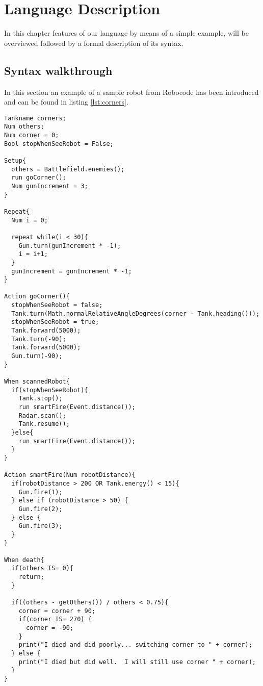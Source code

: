 \chapter{Language Description}
\label{chap:LanguageDescription}
In this chapter features of our language by means of a simple example, will be overviewed followed by a formal description of its syntax. 

\section{Syntax walkthrough}
In this section an example of a sample robot from Robocode has been introduced and can be found in listing \ref{lst:corners}.

\begin{lstlisting}[caption={Eksampel of the sample robot "Corners" in our language}, label={lst:corners}]
Tankname corners;
Num others;
Num corner = 0;
Bool stopWhenSeeRobot = False;

Setup{
  others = Battlefield.enemies();  
  run goCorner();	 
  Num gunIncrement = 3;
}

Repeat{  
  Num i = 0;
  
  repeat while(i < 30){
    Gun.turn(gunIncrement * -1);
    i = i+1;
  }  
  gunIncrement = gunIncrement * -1;
}

Action goCorner(){
  stopWhenSeeRobot = false;  
  Tank.turn(Math.normalRelativeAngleDegrees(corner - Tank.heading()));      
  stopWhenSeeRobot = true;
  Tank.forward(5000);
  Tank.turn(-90);
  Tank.forward(5000);
  Gun.turn(-90);
}

When scannedRobot{
  if(stopWhenSeeRobot){
    Tank.stop();                                     
    run smartFire(Event.distance());
    Radar.scan();                                     
    Tank.resume();                                   
  }else{
    run smartFire(Event.distance());
  }
}

Action smartFire(Num robotDistance){
  if(robotDistance > 200 OR Tank.energy() < 15){
    Gun.fire(1);
  } else if (robotDistance > 50) {
    Gun.fire(2);
  } else {
    Gun.fire(3);
  }
}

When death{
  if(others IS= 0){
    return;
  }
  
  if((others - getOthers()) / others < 0.75){
    corner = corner + 90;
    if(corner IS= 270) {
      corner = -90;
    }
    print("I died and did poorly... switching corner to " + corner);
  } else {
    print("I died but did well.  I will still use corner " + corner);
  }
}
\end{lstlisting}

